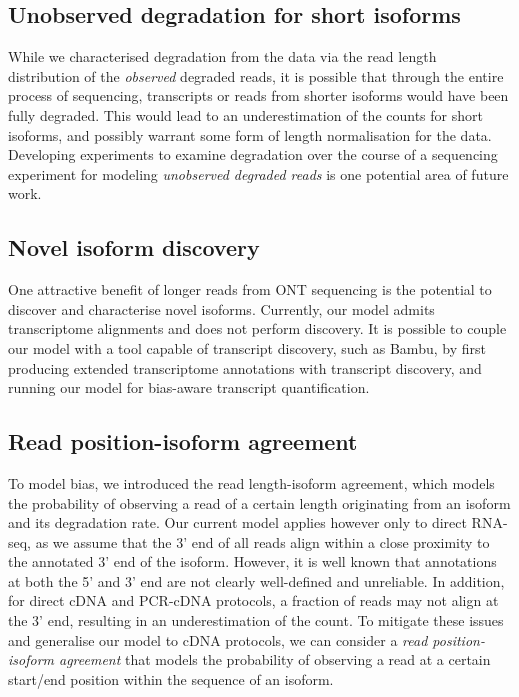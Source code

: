 \subsection{Unobserved degradation for short isoforms}

While we characterised degradation from the data via the read length distribution of the \textit{observed} degraded reads, it is possible that through the entire process of sequencing, transcripts or reads from shorter isoforms would have been fully degraded. This would lead to an underestimation of the counts for short isoforms, and possibly warrant some form of length normalisation for the data. Developing experiments to examine degradation over the course of a sequencing experiment for modeling \textit{unobserved degraded reads} is one potential area of future work.  

\subsection{Novel isoform discovery}

One attractive benefit of longer reads from ONT sequencing is the potential to discover and characterise novel isoforms. Currently, our model admits transcriptome alignments and does not perform discovery. It is possible to couple our model with a tool capable of transcript discovery, such as Bambu, by first producing extended transcriptome annotations with transcript discovery, and running our model for bias-aware transcript quantification.  

\subsection{Read position-isoform agreement}

To model bias, we introduced the read length-isoform agreement, which models the probability of observing a read of a certain length originating from an isoform and its degradation rate. Our current model applies however only to direct RNA-seq, as we assume that the 3' end of all reads align within a close proximity to the annotated 3' end of the isoform. However, it is well known that annotations at both the 5' and 3' end are not clearly well-defined and unreliable. In addition, for direct cDNA and PCR-cDNA protocols, a fraction of reads may not align at the 3' end, resulting in an underestimation of the count. To mitigate these issues and generalise our model to cDNA protocols, we can consider a \textit{read position-isoform agreement} that models the probability of observing a read at a certain start/end position within the sequence of an isoform. 

